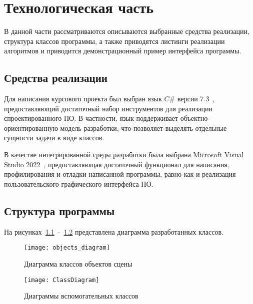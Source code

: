 \chapter{Технологическая часть}

В данной части рассматриваются описываются выбранные средства реализации, структура классов программы, а также приводятся листинги реализации алгоритмов и приводится демонстрационный пример интерфейса программы.

\section{Средства реализации}
Для написания курсового проекта был выбран язык $C\#$ версии 7.3~\cite{CSharp}, предоставляющий достаточный набор инструментов для реализации спроектированного ПО. В частности, язык поддерживает объектно-ориентированную модель разработки, что позволяет выделять отдельные сущности задачи в виде классов.

В качестве интегрированной среды разработки была выбрана Microsoft Visual Studio 2022~\cite{VS2022}, предоставляющая достаточный функционал для написания, профилирования и отладки написанной программы, равно как и реализация пользовательского графического интерфейса ПО.

\section{Структура программы}
На рисунках~\ref{fig:SceneObjects}~-~\ref{fig:ClassDiagram} представлена диаграмма разработанных классов.
\begin{figure}[H]
	\centering
	\texttt{[image: objects\_diagram]}
	\caption{Диаграмма классов объектов сцены}
	\label{fig:SceneObjects}
\end{figure}

\begin{figure}[H]
	\centering
	\texttt{[image: ClassDiagram]}
	\caption{Диаграммы вспомогательных классов}
	\label{fig:ClassDiagram}
\end{figure}

